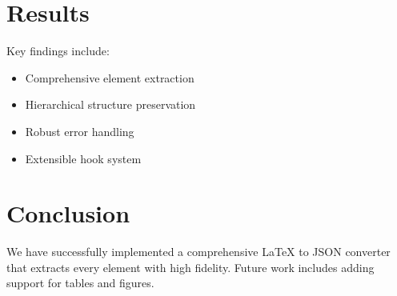 \documentclass{article}
\begin{document}
\section{Results}

Key findings include:
\begin{itemize}
\item Comprehensive element extraction
\item Hierarchical structure preservation
\item Robust error handling
\item Extensible hook system
\end{itemize}

\section{Conclusion}

We have successfully implemented a comprehensive LaTeX to JSON converter
that extracts every element with high fidelity. Future work includes
adding support for tables and figures.
\end{document}
